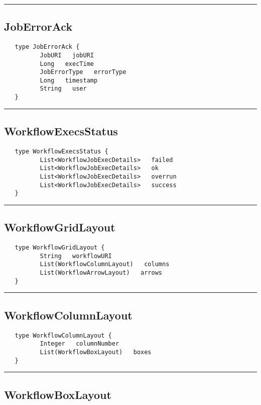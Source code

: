 \rule{15cm}{2pt}
\subsection{JobErrorAck}
\label{type:JobErrorAck}

\begin{verbatim}
   type JobErrorAck {
          JobURI   jobURI
          Long   execTime
          JobErrorType   errorType
          Long   timestamp
          String   user
   }
\end{verbatim}

\rule{15cm}{2pt}
\subsection{WorkflowExecsStatus}
\label{type:WorkflowExecsStatus}

\begin{verbatim}
   type WorkflowExecsStatus {
          List<WorkflowJobExecDetails>   failed
          List<WorkflowJobExecDetails>   ok
          List<WorkflowJobExecDetails>   overrun
          List<WorkflowJobExecDetails>   success
   }
\end{verbatim}

\rule{15cm}{2pt}
\subsection{WorkflowGridLayout}
\label{type:WorkflowGridLayout}

\begin{verbatim}
   type WorkflowGridLayout {
          String   workflowURI
          List(WorkflowColumnLayout)   columns
          List(WorkflowArrowLayout)   arrows
   }
\end{verbatim}

\rule{15cm}{2pt}
\subsection{WorkflowColumnLayout}
\label{type:WorkflowColumnLayout}

\begin{verbatim}
   type WorkflowColumnLayout {
          Integer   columnNumber
          List(WorkflowBoxLayout)   boxes
   }
\end{verbatim}

\rule{15cm}{2pt}
\subsection{WorkflowBoxLayout}
\label{type:WorkflowBoxLayout}

